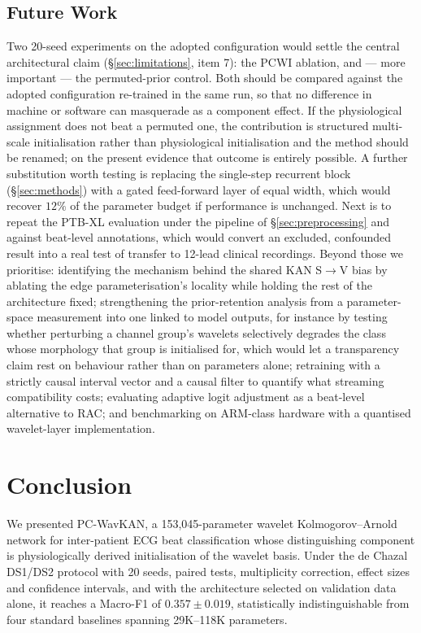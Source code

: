 \documentclass[journal,twoside,web]{ieeecolor}
\begin{document}
\subsection{Future Work}
\label{sec:future}
Two 20-seed experiments on the adopted configuration would settle the central architectural claim (\S\ref{sec:limitations}, item 7): the PCWI ablation, and --- more important --- the permuted-prior control. Both should be compared against the adopted configuration re-trained in the same run, so that no difference in machine or software can masquerade as a component effect. If the physiological assignment does not beat a permuted one, the contribution is structured multi-scale initialisation rather than physiological initialisation and the method should be renamed; on the present evidence that outcome is entirely possible. A further substitution worth testing is replacing the single-step recurrent block (\S\ref{sec:methods}) with a gated feed-forward layer of equal width, which would recover $12\%$ of the parameter budget if performance is unchanged. Next is to repeat the PTB-XL evaluation under the pipeline of \S\ref{sec:preprocessing} and against beat-level annotations, which would convert an excluded, confounded result into a real test of transfer to 12-lead clinical recordings. Beyond those we prioritise: identifying the mechanism behind the shared KAN S$\rightarrow$V bias by ablating the edge parameterisation's locality while holding the rest of the architecture fixed; strengthening the prior-retention analysis from a parameter-space measurement into one linked to model outputs, for instance by testing whether perturbing a channel group's wavelets selectively degrades the class whose morphology that group is initialised for, which would let a transparency claim rest on behaviour rather than on parameters alone; retraining with a strictly causal interval vector and a causal filter to quantify what streaming compatibility costs; evaluating adaptive logit adjustment \cite{dai_angular_2026} as a beat-level alternative to RAC; and benchmarking on ARM-class hardware with a quantised wavelet-layer implementation.

\section{Conclusion}
\label{sec:conclusion}
We presented PC-WavKAN, a 153,045-parameter wavelet Kolmogorov--Arnold network for inter-patient ECG beat classification whose distinguishing component is physiologically derived initialisation of the wavelet basis. Under the de Chazal DS1/DS2 protocol with 20 seeds, paired tests, multiplicity correction, effect sizes and confidence intervals, and with the architecture selected on validation data alone, it reaches a Macro-F1 of $0.357\pm0.019$, statistically indistinguishable from four standard baselines spanning 29K--118K parameters.
\end{document}
